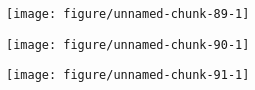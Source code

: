 \documentclass[11pt,a4paper]{article}\usepackage[]{graphicx}\usepackage[]{color}
\makeatletter
\def\maxwidth{ %
  \ifdim\Gin@nat@width>\linewidth
    \linewidth
  \else
    \Gin@nat@width
  \fi
}
\newenvironment{knitrout}{}{} %
\makeatother
\begin{document}
\begin{knitrout}
\color{fgcolor}
\texttt{[image: figure/unnamed-chunk-89-1]} 

\end{knitrout}


\begin{knitrout}
\color{fgcolor}
\texttt{[image: figure/unnamed-chunk-90-1]} 

\end{knitrout}


\begin{knitrout}
\color{fgcolor}
\texttt{[image: figure/unnamed-chunk-91-1]} 

\end{knitrout}
\end{document}
